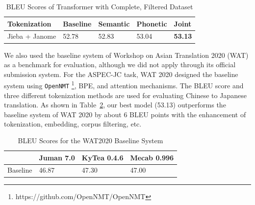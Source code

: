 \vspace{0.5cm}
\begin{table}[h]
    \centering
    \begin{tabularx}{\textwidth}{bbbbb}\toprule
        Tokenization & Baseline & Semantic & Phonetic & Joint \\\midrule
        Jieba + Janome & 52.78 & 52.83 & 53.04 & \textbf{53.13} \\\bottomrule
    \end{tabularx}
    \caption{BLEU Scores of Transformer with Complete, Filtered Dataset}
    \label{tab:transformer_filtered_bleu_score}
\end{table}

We also used the baseline system of Workshop on Asian Translation 2020 (WAT) \cite{nakazawa2020overview} as a benchmark for evaluation, although we did not apply through its official submission system. For the ASPEC-JC task, WAT 2020 designed the baseline system using \texttt{OpenNMT} \footnote{https://github.com/OpenNMT/OpenNMT}, BPE, and attention mechanisms. The BLEU score and three different tokenization methods are used for evaluating Chinese to Japanese translation. As shown in Table~\ref{tab:wat_2020}, our best model (53.13) outperforms the baseline system of WAT 2020 by about 6 BLEU points with the enhancement of tokenization, embedding, corpus filtering, etc.

\vspace{0.5cm}
\begin{table}[h]
    \centering
    \begin{tabularx}{\textwidth}{bbbb}\toprule
         & Juman 7.0 & KyTea 0.4.6 & Mecab 0.996 \\\midrule
        Baseline & 46.87 & 47.30 & 47.00 \\
    \end{tabularx}
    \caption{BLEU Scores for the WAT2020 Baseline System}
    \label{tab:wat_2020}
\end{table}




